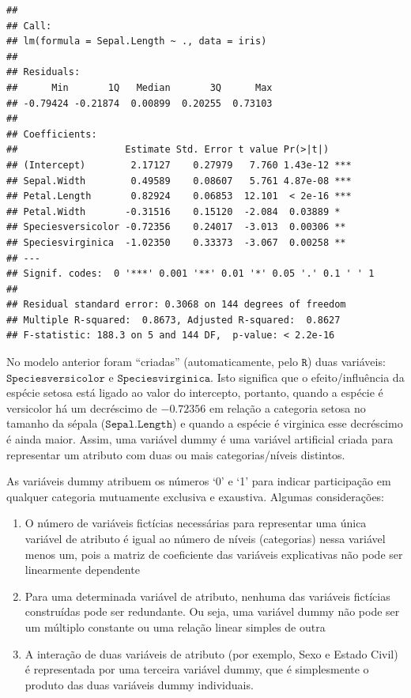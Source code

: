 \documentclass[
]{book}
\providecommand{\tightlist}{%
  \setlength{\itemsep}{0pt}\setlength{\parskip}{0pt}}
\begin{document}
\begin{verbatim}
## 
## Call:
## lm(formula = Sepal.Length ~ ., data = iris)
## 
## Residuals:
##      Min       1Q   Median       3Q      Max 
## -0.79424 -0.21874  0.00899  0.20255  0.73103 
## 
## Coefficients:
##                   Estimate Std. Error t value Pr(>|t|)    
## (Intercept)        2.17127    0.27979   7.760 1.43e-12 ***
## Sepal.Width        0.49589    0.08607   5.761 4.87e-08 ***
## Petal.Length       0.82924    0.06853  12.101  < 2e-16 ***
## Petal.Width       -0.31516    0.15120  -2.084  0.03889 *  
## Speciesversicolor -0.72356    0.24017  -3.013  0.00306 ** 
## Speciesvirginica  -1.02350    0.33373  -3.067  0.00258 ** 
## ---
## Signif. codes:  0 '***' 0.001 '**' 0.01 '*' 0.05 '.' 0.1 ' ' 1
## 
## Residual standard error: 0.3068 on 144 degrees of freedom
## Multiple R-squared:  0.8673, Adjusted R-squared:  0.8627 
## F-statistic: 188.3 on 5 and 144 DF,  p-value: < 2.2e-16
\end{verbatim}

No modelo anterior foram ``criadas'' (automaticamente, pelo \(\texttt{R}\)) duas variáveis: \(\texttt{Speciesversicolor}\) e \(\texttt{Speciesvirginica}\). Isto significa que o efeito/influência da espécie setosa está ligado ao valor do intercepto, portanto, quando a espécie é versicolor há um decréscimo de \(-0.72356\) em relação a categoria setosa no tamanho da sépala (\(\texttt{Sepal.Length}\)) e quando a espécie é virginica esse decréscimo é ainda maior. Assim, uma variável dummy é uma variável artificial criada para representar um atributo com duas ou mais categorias/níveis distintos.

As variáveis dummy atribuem os números `0' e `1' para indicar participação em qualquer categoria mutuamente exclusiva e exaustiva. Algumas considerações:

\begin{enumerate}
\def\labelenumi{\arabic{enumi}.}
\tightlist
\item
  O número de variáveis fictícias necessárias para representar uma única variável de atributo é igual ao número de níveis (categorias) nessa variável menos um, pois a matriz de coeficiente das variáveis explicativas não pode ser linearmente dependente
\item
  Para uma determinada variável de atributo, nenhuma das variáveis fictícias construídas pode ser redundante. Ou seja, uma variável dummy não pode ser um múltiplo constante ou uma relação linear simples de outra
\item
  A interação de duas variáveis de atributo (por exemplo, Sexo e Estado Civil) é representada por uma terceira variável dummy, que é simplesmente o produto das duas variáveis dummy individuais.
\end{enumerate}
\end{document}
